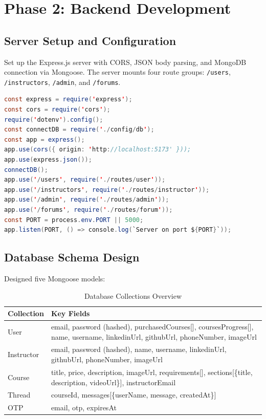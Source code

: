 \documentclass[12pt,a4paper]{report}
\begin{document}
\section{Phase 2: Backend Development}
\subsection{Server Setup and Configuration}
Set up the Express.js server with CORS, JSON body parsing, and MongoDB connection via Mongoose. The server mounts four route groups: \texttt{/users}, \texttt{/instructors}, \texttt{/admin}, and \texttt{/forums}.

\begin{lstlisting}[language=Java, caption={server.js -- Express Server Entry Point}]
const express = require('express');
const cors = require('cors');
require('dotenv').config();
const connectDB = require('./config/db');
const app = express();
app.use(cors({ origin: 'http://localhost:5173' }));
app.use(express.json());
connectDB();
app.use('/users', require('./routes/user'));
app.use('/instructors', require('./routes/instructor'));
app.use('/admin', require('./routes/admin'));
app.use('/forums', require('./routes/forum'));
const PORT = process.env.PORT || 5000;
app.listen(PORT, () => console.log(`Server on port ${PORT}`));
\end{lstlisting}

\subsection{Database Schema Design}
Designed five Mongoose models:

\begin{table}[H]
\centering
\caption{Database Collections Overview}
\begin{tabular}{@{}lp{8cm}@{}}
\toprule
\textbf{Collection} & \textbf{Key Fields} \\ \midrule
User & email, password (hashed), purchasedCourses[], coursesProgress[], name, username, linkedinUrl, githubUrl, phoneNumber, imageUrl \\
Instructor & email, password (hashed), name, username, linkedinUrl, githubUrl, phoneNumber, imageUrl \\
Course & title, price, description, imageUrl, requirements[], sections[\{title, description, videoUrl\}], instructorEmail \\
Thread & courseId, messages[\{userName, message, createdAt\}] \\
OTP & email, otp, expiresAt \\ \bottomrule
\end{tabular}
\end{table}
\end{document}
